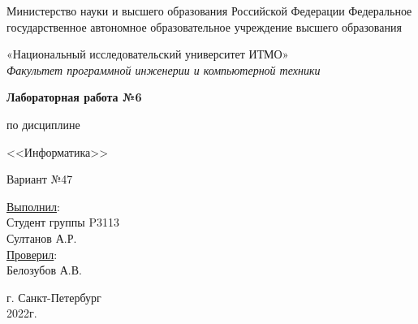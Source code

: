\documentclass[main.tex]{subfiles}
\begin{document}
\thispagestyle{empty}

\begin{center}
Министерство науки и высшего образования Российской Федерации
Федеральное государственное автономное образовательное учреждение высшего образования

«Национальный исследовательский университет ИТМО» \\[1em]

\textit{Факультет программной инженерии и компьютерной техники}

\vspace*{\fill}
\textbf{Лабораторная работа №6}

по дисциплине

<<Информатика>>

Вариант №47

\vspace*{\fill}
\end{center}

\begin{flushright}
\noindent\underline{Выполнил}: \\
Студент группы P3113 \\
Султанов А.Р. \\
\underline{Проверил}: \\
Белозубов А.В.
\end{flushright}

\begin{center}
г. Санкт-Петербург \\
2022г.
\end{center}
\newpage
\end{document}
